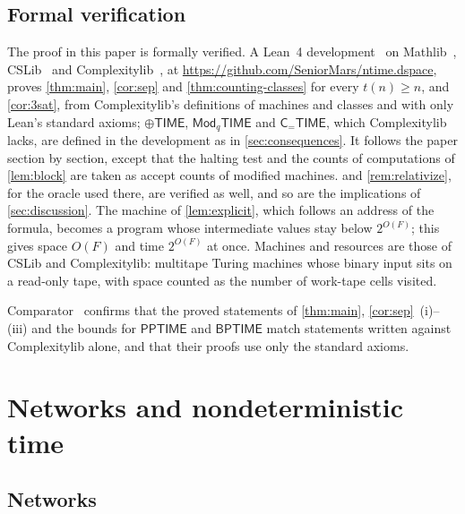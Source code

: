 \documentclass[11pt]{article}
\theoremstyle{definition}
\theoremstyle{definition}
\theoremstyle{remark}
\newcommand{\BPTIME}{\mathsf{BPTIME}}
\newcommand{\PPTIME}{\mathsf{PPTIME}}
\newcommand{\ParTIME}{\oplus\mathsf{TIME}}
\newcommand{\ModTIME}{\mathsf{Mod}_q\mathsf{TIME}}
\newcommand{\CeqTIME}{\mathsf{C}_{=}\mathsf{TIME}}
\begin{document}
\subsection{Formal verification}\label{sec:lean}

The proof in this paper is formally verified. A Lean~4 development~\cite{dMU21} on Mathlib~\cite{Mat20}, CSLib~\cite{CSL} and Complexitylib~\cite{Cplx}, at \url{https://github.com/SeniorMars/ntime.dspace}, proves \cref{thm:main}, \cref{cor:sep} and \cref{thm:counting-classes} for every $t(n)\ge n$, and \cref{cor:3sat}, from Complexitylib's definitions of machines and classes and with only Lean's standard axioms; $\ParTIME$, $\ModTIME$ and $\CeqTIME$, which Complexitylib lacks, are defined in the development as in \cref{sec:consequences}. It follows the paper section by section, except that the halting test and the counts of computations of \cref{lem:block} are taken as accept counts of modified machines.  and \cref{rem:relativize}, for the oracle used there, are verified as well, and so are the implications of \cref{sec:discussion}. The machine of \cref{lem:explicit}, which follows an address of the formula, becomes a program whose intermediate values stay below $2^{O(F)}$; this gives space $O(F)$ and time $2^{O(F)}$ at once. Machines and resources are those of CSLib and Complexitylib: multitape Turing machines whose binary input sits on a read-only tape, with space counted as the number of work-tape cells visited.

Comparator~\cite{Cmp} confirms that the proved statements of \cref{thm:main}, \cref{cor:sep}~(i)--(iii) and the bounds for $\PPTIME$ and $\BPTIME$ match statements written against Complexitylib alone, and that their proofs use only the standard axioms.

\section{Networks and nondeterministic time}\label{sec:networks}

\subsection{Networks}\label{sec:prelims}
\end{document}

